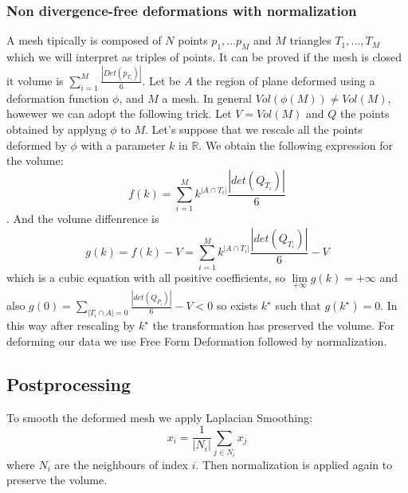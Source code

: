 \documentclass{article}
\begin{document}
\begin{comment}
$$b\in \mathbb{R}^{3}$$
$$c \in \mathbb{R}^{3}$$
$$a \in \mathbb{R}^{3}$$
$$u=\begin{bmatrix} sin(\alpha)cos(\beta) \\ cos(\alpha)cos(\beta)\\
sin(\beta)\end{bmatrix}$$
$$v=\begin{bmatrix} -cos(\alpha) \\ sin(\alpha) \\ 0\end{bmatrix}$$.
$$p_{1}(x)=u \cdot (x-b) $$
$$q_{1}(x)=w \cdot (x-b)$$
$$p_{2}=a \cdot (x-c)$$
$$q_		{2}=(a\times (x-c))\cdot (a\times (x-c))$$
$$v=\nabla p_{1}\times \nabla q_{1}+\nabla p_{2}\times \nabla q_{2}=u\times w+ a \times (-2a \times (a \times (x-cd)))$$

Note that $u$ and $v$ are orthonormal and so $p_{1}$ and $q_{1}$ represent a costant vector field, and $q_{2}$ and $p_{2}$ represent a linear rotation field.
In total this model has 11 parameters.
\end{comment}
\subsubsection{Non divergence-free deformations with normalization}
A mesh tipically is composed of $N$ points $p_{1},...p_{M}$ and $M$ triangles $T_{1},...,T_{M}$ which we will interpret as triples of points. It can be proved if the mesh is closed it volume is $\sum_{i=1}^{M} \frac{|Det(p_{T_{i}})|}{6}$.
Let be $A$ the region of plane deformed using a deformation function $\phi$, and $M$ a mesh. In general $Vol(\phi(M))\neq Vol(M)$, howewer we can adopt the following trick.
Let $V=Vol(M)$ and $Q$ the points obtained by applyng $\phi$ to $M$.
Let's suppose that we rescale all the points deformed by $\phi$ with a parameter $k$ in $\mathbb{R}$. We obtain the following expression for the volume:
$$f(k)=\sum_{i=1}^{M} k^{|A\cap T_{i}|}\frac{|det(Q_{T_{i}})|}{6}$$. 
And the volume diffenrence is $$g(k)=f(k)-V=\sum_{i=1}^{M} k^{|A\cap T_{i}|}\frac{|det(Q_{T_{i}})|}{6}-V$$ which is a cubic equation with all positive coefficients, so 
$\lim \limits_{+\infty} g(k)=+\infty$ and also $g(0)=\sum_{|T_{i}\cap A|=0}\frac{|det(Q_{P_{i}})|}{6}-V<0$ so exists $k^{\star}$ such that $g(k^{\star})=0$. 
In this way after rescaling by $k^{\star}$ the transformation has preserved the volume.
For deforming our data we use Free Form Deformation followed by normalization.

\subsection{Postprocessing}
To smooth the deformed mesh we apply Laplacian Smoothing:
$$x_{i}=\frac{1}{|N_{i}|}\sum_{j \in N_{i}} x_{j}$$ where $N_{i}$ are the neighbours of index $i$. Then normalization is applied again to preserve the volume.
\end{document}
